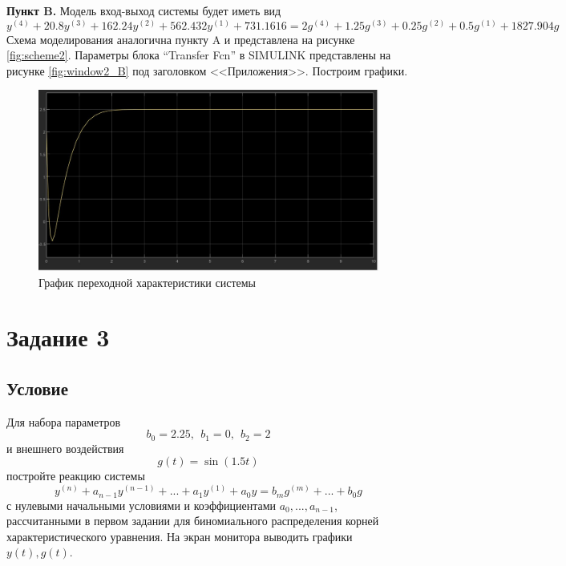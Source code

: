 \documentclass[a4paper, 12pt]{article}
\begin{document}
    \textbf{Пункт B.} Модель вход-выход системы будет иметь вид
    $$y^{(4)}+20.8y^{(3)}+162.24y^{(2)}+562.432y^{(1)}+731.1616=2g^{(4)}+1.25g^{(3)}+0.25g^{(2)}+0.5g^{(1)}+1827.904g$$
    Схема моделирования аналогична пункту A и представлена на рисунке \ref{fig:scheme2}.
    Параметры блока ``Transfer Fcn'' в SIMULINK
    представлены на рисунке \ref{fig:window2_B} под заголовком <<Приложения>>. Построим графики.
    \begin{figure}[H]
        \centering
        \includegraphics[scale=0.3]{task_2_B.jpg}
        \captionsetup{skip=0pt}
        \caption{График переходной характеристики системы}
        \label{fig:2B}
    \end{figure}


    \section{Задание 3}
    \subsection{Условие}
    Для набора параметров $$b_0=2.25,\ \ b_1=0,\ \ b_2=2$$ и внешнего воздействия
    $$g(t)=\sin{\left(1.5t\right)}$$ постройте реакцию системы
    $$y^{(n)}+a_{n-1}y^{(n-1)}+...+a_1y^{(1)}+a_0y=b_mg^{(m)}+...+b_0g$$ с нулевыми начальными
    условиями и коэффициентами $a_0,...,a_{n-1}$, рассчитанными
    в первом задании для биномиального распределения корней характеристического уравнения.
    На экран монитора выводить графики $y(t),g(t)$.
\end{document}
